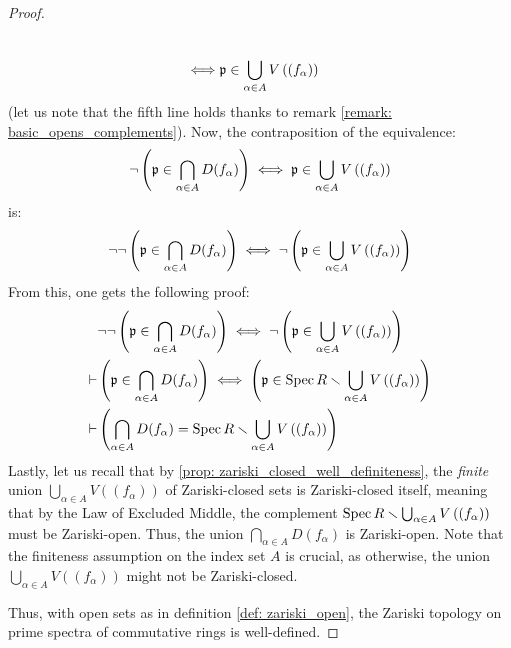 \begin{proof}
\begin{enumerate}
$$\begin{aligned}
                                        \\
                                        \iff & \mathfrak{p} \in \bigcup_{\alpha \in A} V\left((f_{\alpha})\right)
                                    \end{aligned}
                                $$
                            (let us note that the fifth line holds thanks to remark \ref{remark: basic_opens_complements}). Now, the contraposition of the equivalence:
                                $$\neg \left(\mathfrak{p} \in \bigcap_{\alpha \in A} D(f_{\alpha})\right) \iff \mathfrak{p} \in \bigcup_{\alpha \in A} V\left((f_{\alpha})\right)$$
                            is:
                                $$\neg \neg \left(\mathfrak{p} \in \bigcap_{\alpha \in A} D(f_{\alpha})\right) \iff \neg \left(\mathfrak{p} \in \bigcup_{\alpha \in A} V\left((f_{\alpha})\right) \right)$$
                            From this, one gets the following proof:
                                $$
                                    \begin{aligned}
                                        & \neg \neg \left(\mathfrak{p} \in \bigcap_{\alpha \in A} D(f_{\alpha})\right) \iff \neg \left(\mathfrak{p} \in \bigcup_{\alpha \in A} V\left((f_{\alpha})\right) \right)
                                        \\
                                        \vdash & \left(\mathfrak{p} \in \bigcap_{\alpha \in A} D(f_{\alpha})\right) \iff \left(\mathfrak{p} \in \operatorname{Spec} R \smallsetminus \bigcup_{\alpha \in A} V\left((f_{\alpha})\right) \right) 
                                        \\
                                        \vdash & \left(\bigcap_{\alpha \in A} D(f_{\alpha}) = \operatorname{Spec} R \smallsetminus \bigcup_{\alpha \in A} V\left((f_{\alpha})\right)\right)
                                    \end{aligned}
                                $$
                            Lastly, let us recall that by \ref{prop: zariski_closed_well_definiteness}, the \textit{finite} union $\bigcup_{\alpha \in A} V\left((f_{\alpha})\right)$ of Zariski-closed sets is Zariski-closed itself, meaning that by the Law of Excluded Middle, the complement $\operatorname{Spec} R \smallsetminus \bigcup_{\alpha \in A} V\left((f_{\alpha})\right)$ must be Zariski-open. Thus, the union $\bigcap_{\alpha \in A} D(f_{\alpha})$ is Zariski-open. Note that the finiteness assumption on the index set $A$ is crucial, as otherwise, the union $\bigcup_{\alpha \in A} V\left((f_{\alpha})\right)$ might not be Zariski-closed.
                        \end{enumerate}
                    Thus, with open sets as in definition \ref{def: zariski_open}, the Zariski topology on prime spectra of commutative rings is well-defined.
                \end{proof}
            
